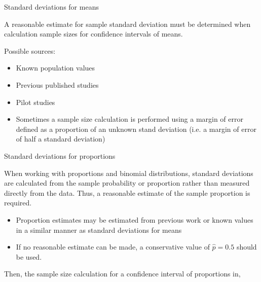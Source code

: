 \documentclass[xcolor=table, aspectratio=169, bigger]{beamer}
\begin{document}
\begin{frame}{Standard deviations for means}
\begin{block}{}
A reasonable estimate for sample standard deviation must be determined when calculation sample sizes for confidence intervals of means.\\ \medskip

Possible sources:
\begin{itemize}
\pause \item Known population values

\pause\item Previous published studies

\pause\item Pilot studies

\pause \item Sometimes a sample size calculation is performed using a margin of error defined as a proportion of an unknown stand deviation (i.e. a margin of error of half a standard deviation)
\end{itemize}

\end{block}
\end{frame}

\begin{frame}{Standard deviations for proportions}
\begin{block}{}
When working with proportions and binomial distributions, standard deviations are calculated from the sample probability or proportion rather than measured directly from the data. Thus, a reasonable estimate of the sample proportion is required.\\ \medskip

\begin{itemize}
\pause \item Proportion estimates may be estimated from previous work or known values in a similar manner as standard deviations for means

\pause\item If no reasonable estimate can be made, a conservative value of $\hat p = 0.5$ should be used.
\end{itemize}

Then, the sample size calculation for a confidence interval of proportions in,\\ \smallskip

\end{block}
\end{frame}
\end{document}
